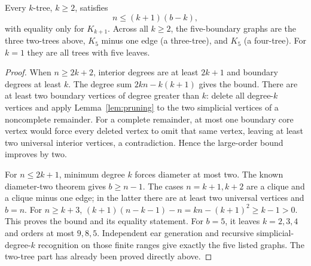 \begin{proposition}\label{prop:ktrees}
Every $k$-tree, $k\ge2$, satisfies
\[
 n\le(k+1)(b-k),
\]
with equality only for $K_{k+1}$. Across all $k\ge2$, the five-boundary
graphs are the three two-trees above, $K_5$ minus one edge (a three-tree),
and $K_5$ (a four-tree). For $k=1$ they are all trees with five leaves.
\end{proposition}
\begin{proof}
When $n\ge2k+2$, interior degrees are at least $2k+1$ and boundary
degrees at least $k$. The degree sum $2kn-k(k+1)$ gives the bound.
There are at least two boundary vertices of degree greater than $k$:
delete all degree-$k$ vertices and apply Lemma~\ref{lem:pruning} to the
two simplicial vertices of a noncomplete remainder. For a complete
remainder, at most one boundary core vertex would force every deleted
vertex to omit that same vertex, leaving at least two universal interior
vertices, a contradiction. Hence the large-order bound improves by two.

For $n\le2k+1$, minimum degree $k$ forces diameter at most two.
The known diameter-two theorem gives $b\ge n-1$. The cases
$n=k+1,k+2$ are a clique and a clique minus one edge; in the latter
there are at least two universal vertices and $b=n$.
For $n\ge k+3$,
$(k+1)(n-k-1)-n=kn-(k+1)^2\ge k-1>0$.
This proves the bound and its equality statement.
For $b=5$, it leaves $k=2,3,4$ and orders at most $9,8,5$.
Independent ear generation and recursive simplicial-degree-$k$
recognition on those finite ranges give exactly the five listed graphs.
The two-tree part has already been proved directly above.
\end{proof}

